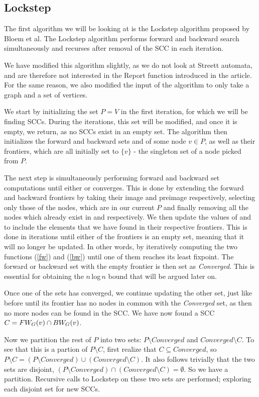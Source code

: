 \documentclass[../master/master.tex]{subfiles}
\begin{document}
\subsection{Lockstep}
The first algorithm we will be looking at is the Lockstep algorithm proposed by Bloem et al. \cite{lockstep} The Lockstep algorithm performs forward and backward search simultaneously and recurses after removal of the SCC in each iteration.

We have modified this algorithm slightly, as we do not look at Streett automata, and are therefore not interested in the Report function introduced in the article. For the same reason, we also modified the input of the algorithm to only take a graph and a set of vertices. 

We start by initializing the set $P=V$ in the first iteration, for which we will be finding SCCs. During the iterations, this set will be modified, and once it is empty, we return, as no SCCs exist in an empty set. The algorithm then initializes the forward and backward sets  and  of some node $v\in P$, as well as their frontiers, which are all initially set to $\{v\}$ - the singleton set of a node picked from $P$.

The next step is simultaneously performing forward and backward set computations until either  or  converges. This is done by extending the forward and backward frontiers by taking their image and preimage respectively, selecting only those of the nodes, which are in our current $P$ and finally removing all the nodes which already exist in  and  respectively. We then update the values of  and  to include the elements that we have found in their respective frontiers. This is done in iterations until either of the frontiers is an empty set, meaning that it will no longer be updated.
In other words, by iteratively computing the two functions (\ref{fw}) and (\ref{bw}) until one of them reaches its least fixpoint. The forward or backward set with the empty frontier is then set as \emph{Converged}. This is essential for obtaining the $n$\,log\,$n$ bound that will be argued later on.

Once one of the sets has converged, we continue updating the other set, just like before until its frontier has no nodes in common with the \emph{Converged} set, as then no more nodes can be found in the SCC.
We have now found a SCC $C=FW_{G}(v)\cap BW_{G}(v)$. 

Now we partition the rest of $P$ into two sets: $P\setminus Converged$ and $Converged\setminus C$. To see that this is a partion of $P\setminus C$, first realize that $C\subseteq Converged$, so $P\setminus C = (P\setminus Converged) \cup (Converged\setminus C)$. It also follows trivially that the two sets are disjoint, $(P\setminus Converged)\cap (Converged\setminus C)=\emptyset$. So we have a partition. Recursive calls to Lockstep on these two sets are performed; exploring each disjoint set for new SCCs. 
\end{document}
